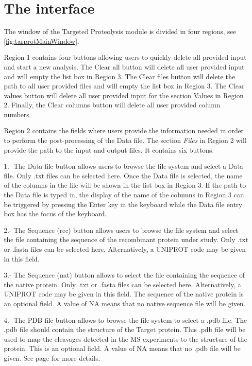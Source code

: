 \section{The interface}

The window of the Targeted Proteolysis module is divided in four regions, see \autoref{fig:tarprotMainWindow}. 

Region \num{1} contains four buttons allowing users to quickly delete all provided input and start a new analysis. The Clear all button will delete all user provided input and will empty the list box in Region \num{3}. The Clear files button will delete the path to all user provided files and will empty the list box in Region \num{3}. The Clear values button will delete all user provided input for the section Values in Region \num{2}. Finally, the Clear columns button will delete all user provided column numbers. 

Region \num{2} contains the fields where users provide the information needed in order to perform the post-processing of the Data file. The section \textit{Files} in Region \num{2} will provide the path to the input and output files. It contains six buttons. 

\num{1}.- The Data file button allows users to browse the file system and select a Data file. Only .txt files can be selected here. Once the Data file is selected, the name of the columns in the file will be shown in the list box in Region \num{3}. If the path to the Data file is typed in, the display of the name of the columns in Region \num{3} can be triggered by pressing the Enter key in the keyboard while the Data file entry box has the focus of the keyboard.

\num{2}.- The Sequence (rec) button allows users to browse the file system and select the file containing the sequence of the recombinant protein under study. Only .txt or .fasta files can be selected here. Alternatively,  a UNIPROT code may be given in this field.

\num{3}.- The Sequence (nat) button allows to select the file containing the sequence of the native protein. Only .txt or .fasta files can be selected here. Alternatively, a UNIPROT code may be given in this field. The sequence of the native protein is an optional field. A value of NA means that no native sequence file will be given. 

\num{4}.- The PDB file button allows to browse the file system to select a .pdb file. The .pdb file should contain the structure of the Target protein. This .pdb file will be used to map the cleavages detected in the MS experiments to the structure of the protein. This is an optional field. A value of NA means that no .pdb file will be given. See page \pageref{par:tarprotPdbID} for more details. 

